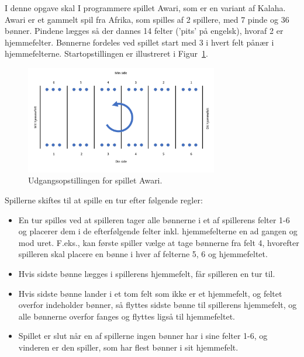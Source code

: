 I denne opgave skal I programmere spillet Awari, som er en variant af
Kalaha. Awari er et gammelt spil fra Afrika, som spilles af 2
spillere, med 7 pinde og 36 bønner. Pindene lægges så der dannes 14
felter ('pits' på engelsk), hvoraf 2 er hjemmefelter.  Bønnerne
fordeles ved spillet start med 3 i hvert felt pånær i
hjemmefelterne. Startopstillingen er illustreret i
Figur~\ref{fig:awari}.
\begin{figure}[h]
  \centering
  \includegraphics[width=0.75\textwidth]{awari.pdf}
  \caption{Udgangsopstillingen for spillet Awari.}
  \label{fig:awari}
\end{figure}

Spillerne skiftes til at spille en tur efter følgende regler:
\begin{itemize}
\item En tur spilles ved at spilleren tager alle bønnerne i et af
  spillerens felter 1-6 og placerer dem i de efterfølgende felter
  inkl. hjemmefelterne en ad gangen og mod uret. F.eks., kan første
  spiller vælge at tage bønnerne fra felt 4, hvorefter spilleren skal
  placere en bønne i hver af felterne 5, 6 og hjemmefeltet.
\item Hvis sidste bønne lægges i spillerens hjemmefelt, får spilleren
  en tur til.
\item Hvis sidste bønne lander i et tom felt som ikke er et hjemmefelt, og
  feltet overfor indeholder bønner, så flyttes sidste bønne til
  spillerens hjemmefelt, og alle bønnerne overfor fanges og flyttes ligså til
  hjemmefeltet.
\item Spillet er slut når en af spillerne ingen bønner har i sine
  felter 1-6, og vinderen er den spiller, som har flest bønner i sit
  hjemmefelt.
\end{itemize}
